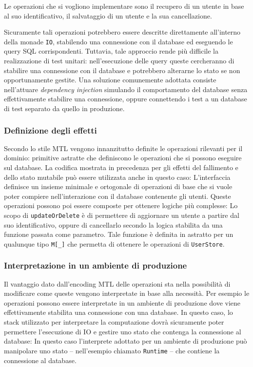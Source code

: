 Le operazioni che si vogliono implementare sono il recupero di un utente in base al suo identificativo, il salvataggio di un utente e la sua cancellazione.

Sicuramente tali operazioni potrebbero essere descritte direttamente all'interno della monade \lstinline{IO}, stabilendo una connessione con il database ed eseguendo le query SQL corrispondenti. Tuttavia, tale approccio rende più difficile la realizzazione di test unitari: nell'esecuzione delle query queste cercheranno di stabilire una connessione con il database e potrebbero alterarne lo stato se non opportunamente gestite. Una soluzione comunemente adottata consiste nell'attuare \emph{dependency injection} simulando il comportamento del database senza effettivamente stabilire una connessione, oppure connettendo i test a un database di test separato da quello in produzione.

\subsubsection{Definizione degli effetti}
Secondo lo stile MTL vengono innanzitutto definite le operazioni rilevanti per il dominio: primitive astratte che definiscono le operazioni che si possono eseguire sul database. La codifica mostrata in precedenza per gli effetti del fallimento e dello stato mutabile può essere utilizzata anche in questo caso:
L'interfaccia definisce un insieme minimale e ortogonale di operazioni di base che si vuole poter compiere nell'interazione con il database contenente gli utenti. Queste operazioni possono poi essere composte per ottenere logiche più complesse:
Lo scopo di \lstinline{updateOrDelete} è di permettere di aggiornare un utente a partire dal suo identificativo, oppure di cancellarlo secondo la logica stabilita da una funzione passata come parametro.
Tale funzione è definita in astratto per un qualunque tipo \lstinline{M[_]} che permetta di ottenere le operazioni di \lstinline{UserStore}.

\subsubsection{Interpretazione in un ambiente di produzione}
Il vantaggio dato dall'encoding MTL delle operazioni sta nella possibilità di modificare come queste vengono interpretate in base alla necessità.
Per esempio le operazioni possono essere interpretate in un ambiente di produzione dove viene effettivamente stabilita una connessione con una database. In questo caso, lo stack utilizzato per interpretare la computazione dovrà sicuramente poter permettere l'esecuzione di IO e gestire uno stato che contenga la connessione al database:
In questo caso l'interprete adottato per un ambiente di produzione può manipolare uno stato -- nell'esempio chiamato \lstinline{Runtime} -- che contiene la connessione al database.

